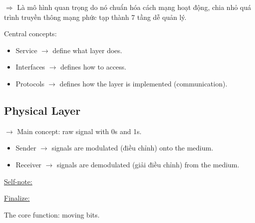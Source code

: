 $\Rightarrow$ Là mô hình quan trọng do nó chuẩn hóa cách mạng hoạt động, chia nhỏ quá trình truyền thông mạng phức tạp thành 7 tầng dễ quản lý.
\medskip

\noindent
Central concepts:

\begin{itemize}
    \item Service $\rightarrow$ define what layer does.
    \item Interfaces $\rightarrow$ defines how to access.
    \item Protocols $\rightarrow$ defines how the layer is implemented (communication).
\end{itemize}
\medskip

\subsection{Physical Layer}

\noindent
$\rightarrow$ Main concept: raw signal with 0s and 1s.

\begin{itemize}
    \item Sender $\rightarrow$ signals are modulated (điều chỉnh) onto the medium.
    \item Receiver $\rightarrow$ signals are demodulated (giải điều chỉnh) from the medium.
\end{itemize}
\medskip

\noindent
\underline{Self-note:}
\medskip

\begin{center}
\end{center}
\medskip

\noindent
\underline{Finalize:}
\medskip

\noindent
The core function: moving bits.

